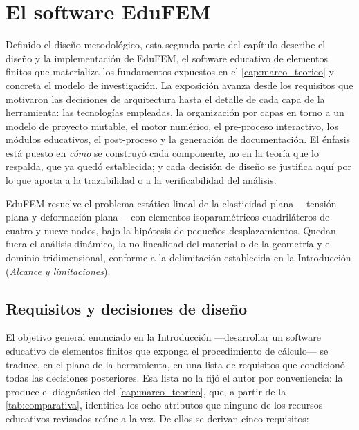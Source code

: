 \section{El software EduFEM}
\label{sec:diseno-edufem}

Definido el diseño metodológico, esta segunda parte del capítulo describe el diseño y la implementación de EduFEM, el software educativo de elementos finitos que materializa los fundamentos expuestos en el \autoref{cap:marco_teorico} y concreta el modelo de investigación. La exposición avanza desde los requisitos que motivaron las decisiones de arquitectura hasta el detalle de cada capa de la herramienta: las tecnologías empleadas, la organización por capas en torno a un modelo de proyecto mutable, el motor numérico, el pre-proceso interactivo, los módulos educativos, el post-proceso y la generación de documentación. El énfasis está puesto en \emph{cómo} se construyó cada componente, no en la teoría que lo respalda, que ya quedó establecida; y cada decisión de diseño se justifica aquí por lo que aporta a la trazabilidad o a la verificabilidad del análisis.

EduFEM resuelve el problema estático lineal de la elasticidad plana —tensión plana y deformación plana— con elementos isoparamétricos cuadriláteros de cuatro y nueve nodos, bajo la hipótesis de pequeños desplazamientos. Quedan fuera el análisis dinámico, la no linealidad del material o de la geometría y el dominio tridimensional, conforme a la delimitación establecida en la Introducción (\emph{Alcance y limitaciones}).

\subsection{Requisitos y decisiones de diseño}
\label{sec:requisitos}

El objetivo general enunciado en la Introducción —desarrollar un software educativo de elementos finitos que exponga el procedimiento de cálculo— se traduce, en el plano de la herramienta, en una lista de requisitos que condicionó todas las decisiones posteriores. Esa lista no la fijó el autor por conveniencia: la produce el diagnóstico del \autoref{cap:marco_teorico}, que, a partir de la \autoref{tab:comparativa}, identifica los ocho atributos que ninguno de los recursos educativos revisados reúne a la vez. De ellos se derivan cinco requisitos:

